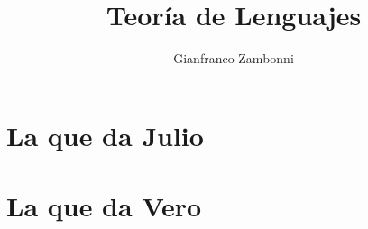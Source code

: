 

\title{Teoría de Lenguajes}
\author{Gianfranco Zambonni}


\theoremstyle{definition}
\newtheorem{definition}{Definición}[section]
\newtheorem{teorema}{Teorema}[section]
\newtheorem{lemma}{Lema}[section]


\maketitle
\maketitle
\tableofcontents
\newpage

\part{La que da Julio}

\newpage


\newpage


\newpage


\newpage


\newpage


\newpage


\newpage


\newpage
\part{La que da Vero}

